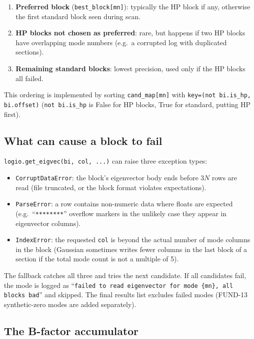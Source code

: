 \documentclass[10pt,a4paper,twoside]{article}
\newcommand{\fn}[1]{\texttt{#1}}
\begin{document}
\begin{enumerate}
  \item \textbf{Preferred block} (\fn{best\_block[mn]}): typically
        the HP block if any, otherwise the first standard block
        seen during scan.
  \item \textbf{HP blocks not chosen as preferred}: rare, but
        happens if two HP blocks have overlapping mode numbers
        (e.g.\ a corrupted log with duplicated sections).
  \item \textbf{Remaining standard blocks}: lowest precision,
        used only if the HP blocks all failed.
\end{enumerate}

This ordering is implemented by sorting \fn{cand\_map[mn]} with
\texttt{key=(not bi.is\_hp, bi.offset)} (\texttt{not bi.is\_hp}
is False for HP blocks, True for standard, putting HP first).

\subsection{What can cause a block to fail}

\fn{logio.get\_eigvec(bi, col, ...)} can raise three exception
types:

\begin{itemize}
  \item \texttt{CorruptDataError}: the block's eigenvector body
        ends before $3N$ rows are read (file truncated, or the
        block format violates expectations).
  \item \texttt{ParseError}: a row contains non-numeric data where
        floats are expected (e.g.\ ``\texttt{********}'' overflow
        markers in the unlikely case they appear in eigenvector
        columns).
  \item \texttt{IndexError}: the requested \texttt{col} is beyond
        the actual number of mode columns in the block (Gaussian
        sometimes writes fewer columns in the last block of a
        section if the total mode count is not a multiple of 5).
\end{itemize}

The fallback catches all three and tries the next candidate. If
all candidates fail, the mode is logged as ``\texttt{failed to read
eigenvector for mode \{mn\}, all blocks bad}'' and skipped. The
final results list excludes failed modes (FUND-13 synthetic-zero
modes are added separately).

\subsection{The B-factor accumulator}
\end{document}
